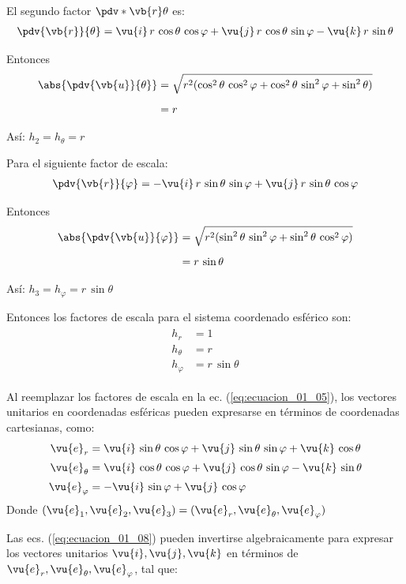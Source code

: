 El segundo factor $\pdv*{\vb{r}}{\theta}$ es:
\begin{align*}
\pdv{\vb{r}}{\theta} = \vu{i} \, r \, \cos \theta \, \cos \varphi + \vu{j} \, r \, \cos \theta \, \sin \varphi - \vu{k} \, r \, \sin \theta
\end{align*}
\par
Entonces
\begin{align*}
\abs{\pdv{\vb{u}}{\theta}} &= \sqrt{r^{2} (\cos^{2} \theta \, \cos^{2} \varphi + \cos^{2} \theta \, \sin^{2} \varphi + \sin^{2} \theta)} \\[0.5em]
&= r
\end{align*}
\par
Así: $h_{2} = h_{\theta} = r$
\par
Para el siguiente factor de escala:
\begin{align*}
\pdv{\vb{r}}{\varphi} = - \vu{i} \, r \, \sin \theta \, \sin \varphi + \vu{j} \, r \, \sin \theta \, \cos \varphi
\end{align*}
\par
Entonces
\begin{align*}
\abs{\pdv{\vb{u}}{\varphi}} &= \sqrt{r^{2} (\sin^{2} \theta \, \sin^{2} \varphi + \sin^{2} \theta \, \cos^{2} \varphi)} \\[0.5em]
&= r \, \sin \theta
\end{align*}
\par
Así: $h_{3} = h_{\varphi} = r \, \sin \theta$
\par
Entonces los factores de escala para el sistema coordenado esférico son:
\begin{align}
\begin{aligned}
h_{r} &= 1 \\[0.5em]
h_{\theta} &= r \\[0.5em]
h_{\varphi} &= r \, \sin \theta
\end{aligned}
\label{eq:ecuacion_01_07}
\end{align}
\par
Al reemplazar los factores de escala en la ec. (\ref{eq:ecuacion_01_05}), los vectores unitarios en coordenadas esféricas pueden expresarse en términos de coordenadas cartesianas, como:
\begin{align}
\begin{aligned}
\vu{e}_{r} &= \vu{i} \, \sin \theta \, \cos \varphi + \vu{j} \, \sin \theta \, \sin \varphi + \vu{k} \, \cos \theta \\[0.25em]
\vu{e}_{\theta} &= \vu{i} \, \cos \theta \, \cos \varphi + \vu{j} \, \cos \theta \, \sin \varphi - \vu{k} \, \sin \theta \\[0.25em]
\vu{e}_{\varphi} &= - \vu{i} \, \sin \varphi + \vu{j} \, \cos \varphi
\end{aligned}
\label{eq:ecuacion_01_08}
\end{align}
Donde $(\vu{e}_{1}, \vu{e}_{2}, \vu{e}_{3}) = (\vu{e}_{r}, \vu{e}_{\theta}, \vu{e}_{\varphi})$
\par
Las ecs. (\ref{eq:ecuacion_01_08}) pueden invertirse algebraicamente para expresar los vectores unitarios $\vu{i}, \vu{j}, \vu{k}$ en términos de $\vu{e}_{r}, \vu{e}_{\theta}, \vu{e}_{\varphi}$, tal que:

